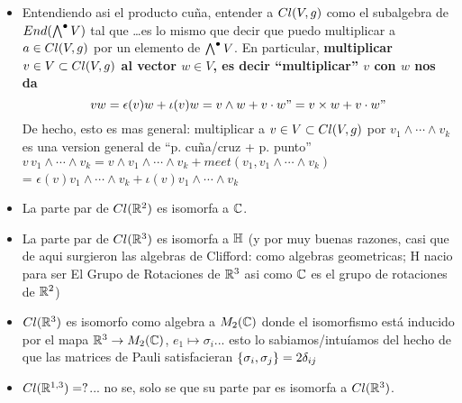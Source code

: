 \begin{frame}
\begin{itemize}
        \item Entendiendo asi el producto cuña, entender a $Cl(V, g)$ como el subalgebra de $End(\bigwedge^\bullet V)$ tal que \dots es lo mismo que decir que puedo multiplicar a $a \in Cl(V, g)$ por un elemento de $\bigwedge^\bullet V$. En particular, \textbf{multiplicar $v \in V \subset Cl(V, g)$ al vector $w \in V$, es decir ``multiplicar'' $v$ con $w$ nos da \[vw = \epsilon(v)w + \iota(v)w = v \wedge w + v \cdot w "= v \times w + v \cdot w "\]} De hecho, esto es mas general: multiplicar a $v \in V \subset Cl(V, g)$ por $v_1 \wedge \cdots \wedge v_k$ es una version general de ``p. cu\~na/cruz + p. punto'' $v \,v_1 \wedge \cdots \wedge v_k = v \wedge v_1 \wedge \cdots \wedge v_k + meet(v_1, v_1 \wedge \cdots \wedge v_k)$\\ = $\epsilon(v) v_1 \wedge \cdots \wedge v_k + \iota(v) v_1 \wedge \cdots \wedge v_k$
        
        \item La parte par de $Cl(\mathbb R^2)$ es isomorfa a $\mathbb C$.
        
        \item La parte par de $Cl(\mathbb R^3)$ es isomorfa a $\mathbb H$ (y por muy buenas razones, casi que de aqui surgieron las algebras de Clifford: como algebras geometricas; H nacio para ser El Grupo de Rotaciones de $\mathbb R^3$ asi como $\mathbb C$ es el grupo de rotaciones de $\mathbb R^2$)
        
        \item $Cl(\mathbb R^3)$ es isomorfo como algebra a $M_2(\mathbb C)$ donde el isomorfismo está inducido por el mapa $\mathbb R^3 \to M_2(\mathbb C)$, $e_1 \mapsto \sigma_i$... esto lo sabiamos/intuíamos del hecho de que las matrices de Pauli satisfacieran $\{\sigma_i, \sigma_j\} = 2 \delta_{ij}$
        
        \item $Cl(\mathbb R^{1, 3}) = ?$... no se, solo se que su parte par es isomorfa a $Cl(\mathbb R^3)$.
            
        \end{itemize}
\end{frame}
